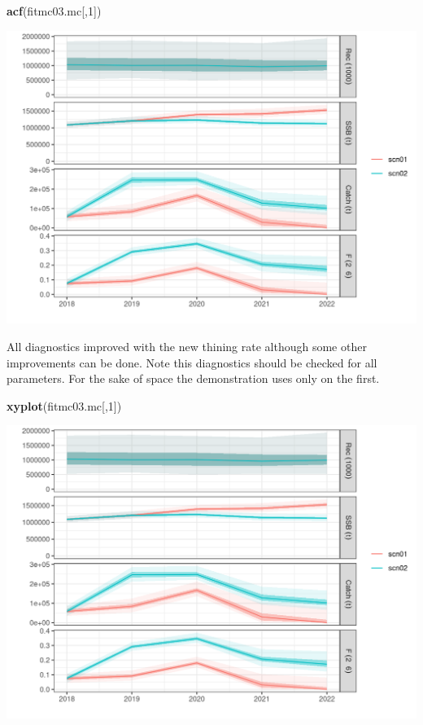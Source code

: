 \documentclass[
]{book}
\newenvironment{Shaded}{\begin{snugshade}}{\end{snugshade}}
\newcommand{\DecValTok}[1]{\textcolor[rgb]{0.00,0.00,0.81}{#1}}
\newcommand{\FunctionTok}[1]{\textcolor[rgb]{0.13,0.29,0.53}{\textbf{#1}}}
\newcommand{\NormalTok}[1]{#1}
\begin{document}
\begin{Shaded}
\begin{Highlighting}[]
\FunctionTok{acf}\NormalTok{(fitmc03.mc[,}\DecValTok{1}\NormalTok{])}
\end{Highlighting}
\end{Shaded}

\includegraphics{_bookdown_files/_main_files/figure-html/unnamed-chunk-127-1.png}

All diagnostics improved with the new thining rate although some other improvements can be done. Note this diagnostics should be checked for all parameters. For the sake of space the demonstration uses only on the first.

\begin{Shaded}
\begin{Highlighting}[]
\FunctionTok{xyplot}\NormalTok{(fitmc03.mc[,}\DecValTok{1}\NormalTok{])}
\end{Highlighting}
\end{Shaded}

\includegraphics{_bookdown_files/_main_files/figure-html/unnamed-chunk-128-1.png}
\end{document}
